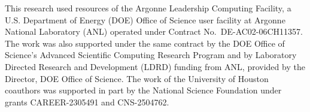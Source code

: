 \documentclass[sigconf,nonacm,balance=false]{aamas}
\begin{document}


\begin{teaserfigure}
\noindent{}
\end{teaserfigure}

\maketitle














\begin{acks}
This research used resources of the Argonne Leadership Computing Facility, a
U.S. Department of Energy (DOE) Office of Science user facility at Argonne
National Laboratory (ANL) operated under Contract
No.~DE-AC02-06CH11357. The work was also supported under the same contract by
the DOE Office of Science's Advanced Scientific Computing Research Program and
by Laboratory Directed Research and Development (LDRD) funding from ANL,
provided by the Director, DOE Office of Science.
The work of the University of Houston coauthors was supported in part by the
National Science Foundation under grants CAREER-2305491 and CNS-2504762.
\end{acks}


\end{document}
